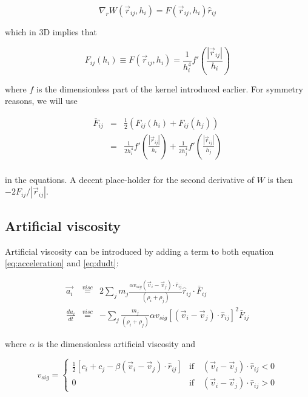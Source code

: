 \documentclass[a4paper,10pt]{article}
\begin{document}
\begin{equation}
 \nabla_r W(\vec{r}_{ij},h_i) = F(\vec{r}_{ij},h_i) \hat{r}_{ij}
\end{equation}

which in 3D implies that

\begin{equation}
 F_{ij}(h_i) \equiv F(\vec{r}_{ij},h_i) = \frac{1}{h_i^4}f'\left(\frac{|\vec{r}_{ij}|}{h_i}\right)
\end{equation}

where $f$ is the dimensionless part of the kernel introduced earlier. For symmetry reasons, we will use

\begin{eqnarray}
 \bar{F}_{ij} &=& \frac{1}{2} \left(F_{ij}(h_i) + F_{ij}(h_j)\right) \\
	      &=& \frac{1}{2h_i^4}f'\left(\frac{|\vec{r}_{ij}|}{h_i}\right) +
\frac{1}{2h_j^4}f'\left(\frac{|\vec{r}_{ij}|}{h_j}\right) \\
\end{eqnarray}

in the equations. A decent place-holder for the second derivative of $W$ is then $-2F_{ij}/|\vec{r}_{ij}|$.

\subsection{Artificial viscosity}

 Artificial viscosity can be introduced by adding a term to both equation \ref{eq:acceleration} and \ref{eq:dudt}:

\begin{eqnarray}
  \vec{a_i} &\stackrel{visc}{=}& 2\sum_j m_j \frac{\alpha v_{sig}\left(\vec{v}_i -
\vec{v}_j\right)\cdot\hat{r}_{ij}}{\left(\rho_i + \rho_j\right)}\hat{r}_{ij}\cdot \bar{F}_{ij} \label{eq:visc}\\
 \frac{du_i}{dt} &\stackrel{visc}{=}& -\sum_j \frac{m_j}{(\rho_i + \rho_j)} \alpha
v_{sig}\left[\left(\vec{v}_i-\vec{v}_j\right)\cdot\hat{r}_{ij}\right]^2 \bar{F}_{ij}
\end{eqnarray}

where $\alpha$ is the dimensionless artificial viscosity and

\begin{equation}
 v_{sig} = \begin{cases}
	    \frac{1}{2}\left[c_i + c_j - \beta\left(\vec{v}_i-\vec{v}_j\right)\cdot\hat{r}_{ij} \right] &
\mbox{if} \quad \left(\vec{v}_i-\vec{v}_j\right)\cdot \hat{r}_{ij} < 0\\
            0 & \mbox{if} \quad \left(\vec{v}_i-\vec{v}_j\right)\cdot \hat{r}_{ij} > 0
            \end{cases}
\end{equation}
\end{document}
